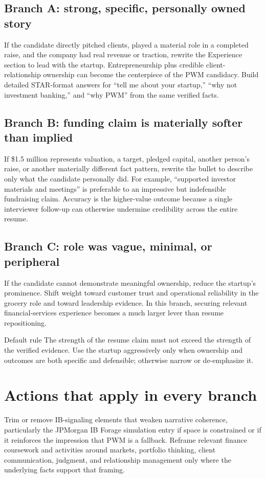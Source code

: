 \documentclass{reportkit}
\begin{document}
\subsection{Branch A: strong, specific, personally owned story}
If the candidate directly pitched clients, played a material role in a completed raise, and the company had real revenue or traction, rewrite the Experience section to lead with the startup. Entrepreneurship plus credible client-relationship ownership can become the centerpiece of the PWM candidacy. Build detailed STAR-format answers for ``tell me about your startup,'' ``why not investment banking,'' and ``why PWM'' from the same verified facts.

\subsection{Branch B: funding claim is materially softer than implied}
If \$1.5 million represents valuation, a target, pledged capital, another person's raise, or another materially different fact pattern, rewrite the bullet to describe only what the candidate personally did. For example, ``supported investor materials and meetings'' is preferable to an impressive but indefensible fundraising claim. Accuracy is the higher-value outcome because a single interviewer follow-up can otherwise undermine credibility across the entire resume.

\subsection{Branch C: role was vague, minimal, or peripheral}
If the candidate cannot demonstrate meaningful ownership, reduce the startup's prominence. Shift weight toward customer trust and operational reliability in the grocery role and toward leadership evidence. In this branch, securing relevant financial-services experience becomes a much larger lever than resume repositioning.

\begin{decisionpoint}{Default rule}
The strength of the resume claim must not exceed the strength of the verified evidence. Use the startup aggressively only when ownership and outcomes are both specific and defensible; otherwise narrow or de-emphasize it.
\end{decisionpoint}

\section{Actions that apply in every branch}
Trim or remove IB-signaling elements that weaken narrative coherence, particularly the JPMorgan IB Forage simulation entry if space is constrained or if it reinforces the impression that PWM is a fallback. Reframe relevant finance coursework and activities around markets, portfolio thinking, client communication, judgment, and relationship management only where the underlying facts support that framing.
\end{document}
